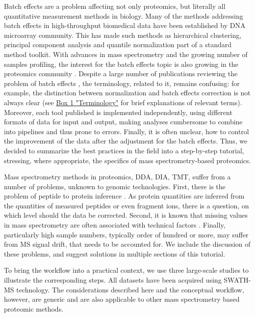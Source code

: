 \documentclass[num-refs]{wiley-article}
\begin{document}
Batch effects are a problem affecting not only proteomics, but literally all quantitative measurement methods in biology. Many of the methods addressing batch effects in high-throughput biomedical data have been established by DNA microarray community. This has made such methods as hierarchical clustering, principal component analysis and quantile normalization part of a standard method toolkit. With advances in mass spectrometry and the growing number of samples profiling, the interest for the batch effects topic is also growing in the proteomics community \cite{Karpievitch2012, Chawade:2014aa, Valikangas2018, Gregori2012}. Despite a large number of publications reviewing the problem of batch effects \cite{Leek:2010aa, Lazar:2013aa, Luo2010, Chen:2011ac, Dillies:2013aa, Chawade:2014aa}, the terminology, related to it, remains confusing: for example, the distinction between normalization and batch effects correction is not always clear (see \hyperref[box:Box1_definitions]{Box 1 "Terminology"} for brief explanations of relevant terms). Moreover, each tool published is implemented independently, using different formats of data for input and output, making analyses cumbersome to combine into pipelines and thus prone to errors. Finally, it is often unclear, how to control the improvement of the data after the adjustment for the batch effects. Thus, we decided to summarize the best practices in the field into a step-by-step tutorial, stressing, where appropriate, the specifics of mass spectrometry-based proteomics.

Mass spectrometry methods in proteomics, DDA, DIA, TMT, suffer from a number of problems, unknown to genomic technologies. First, there is the problem of peptide to protein inference \cite{Clough:2012aa, Teo:2015aa, Rosenberger2014a, Choi2014, Muntel:2019aa}. As protein quantities are inferred from the quantities of measured peptides or even fragment ions, there is a question, on which level should the data be corrected. Second, it is known that missing values in mass spectrometry are often associated with technical factors \cite{Karpievitch2012, Matafora2017}. Finally, particularly high sample numbers, typically order of hundred or more, may suffer from MS signal drift, that needs to be accounted for. We include the discussion of these problems, and suggest solutions in multiple sections of this tutorial.

To bring the workflow into a practical context, we use three large-scale studies to illustrate the corresponding steps. All datasets have been acquired using SWATH-MS technology. The considerations described here and the conceptual workflow, however, are generic and are also applicable to other mass spectrometry based proteomic methods. %
\end{document}
